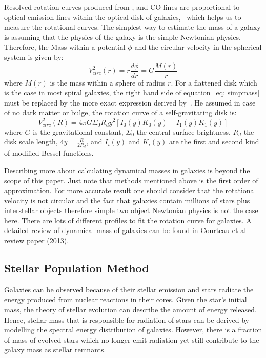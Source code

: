 Resolved rotation curves produced from \halpha, \hi and CO lines are proportional to optical emission lines within the optical disk of galaxies,~\citep{Courteau13} which helps us to measure the rotational curves. 
The simplest way to estimate the mass of a galaxy is assuming that the physics of the galaxy is the simple Newtonian physics. 
Therefore, the Mass within a potential $\phi$ and the circular velocity in the spherical system is given by:
\begin{equation}
\label{eq: simpmass}
V^2_{circ}(r)=r\frac{d\phi}{dr} = G\frac{M(r)}{r}
\end{equation}
where $M(r)$ is the mass within a sphere of radius $r$. 
For a flattened disk which is the case in most spiral galaxies, the right hand side of equation~\ref{eq: simpmass} must be replaced by the more exact expression derived by~\cite{Freeman70}. 
He assumed in case of no dark matter or bulge, the rotation curve of a self-gravitating disk is:
\begin{equation}
V^2_{circ}(R)= 4\pi G \Sigma_{0}R_{d} y^2[I_0(y)K_0(y) - I_1(y)K_1(y)]
\end{equation}
where $G$ is the gravitational constant, $\Sigma_0$ the central surface brightness, $R_d$ the disk scale length, $4y=\frac{R}{2R_d}$, and $I_i(y)$ and $K_i(y)$ are the first and second kind of modified Bessel functions.

Describing more about calculating dynamical masses in galaxies is beyond the scope of this paper. 
Just note that methods mentioned above is the first order of approximation. 
For more accurate result one should consider that the rotational velocity is not circular and the fact that galaxies contain millions of stars plus interstellar objects therefore simple two object Newtonian physics is not the case here. 
There are lots of different profiles to fit the rotation curve for galaxies.
A detailed review of dynamical mass of galaxies can be found in Courteau et al review paper (2013).

\subsection{Stellar Population Method}
Galaxies can be observed because of their stellar emission and stars radiate the energy produced from nuclear reactions in their cores. 
Given the star's initial mass, the theory of stellar evolution can describe the amount of energy released. 
Hence, stellar mass that is responsible for radiation of stars can be derived by modelling the spectral energy distribution of galaxies. 
However, there is a fraction of mass of evolved stars which no longer emit radiation yet still contribute to the galaxy mass as stellar remnants. 


